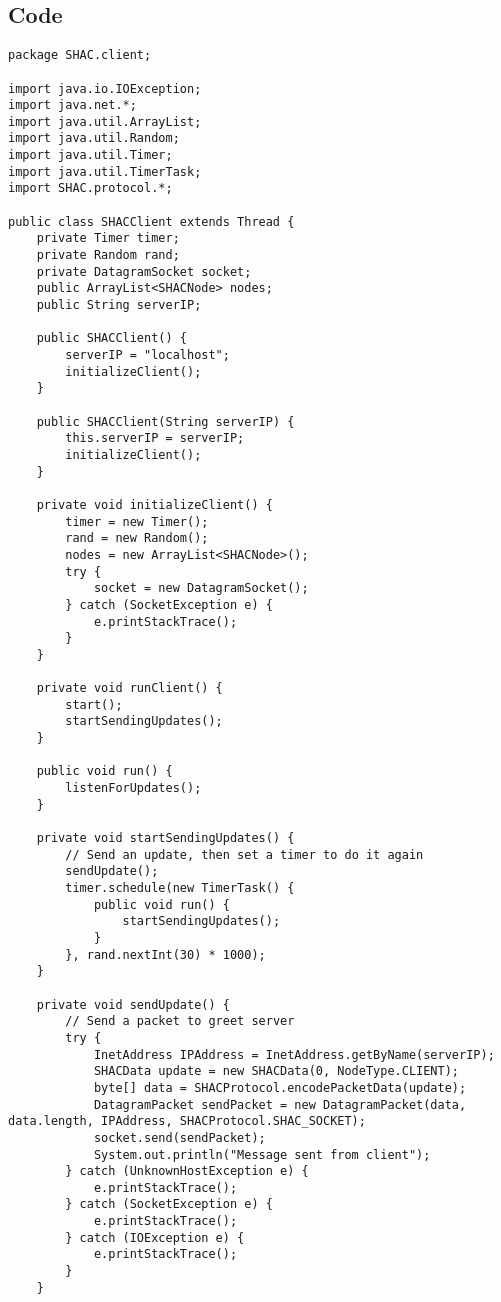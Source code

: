 \documentclass[11pt]{article}
\begin{document}
\begin{doublespace}
  \section{Code}

\begin{lstlisting}
package SHAC.client;

import java.io.IOException;
import java.net.*;
import java.util.ArrayList;
import java.util.Random;
import java.util.Timer;
import java.util.TimerTask;
import SHAC.protocol.*;

public class SHACClient extends Thread {
    private Timer timer;
    private Random rand;
    private DatagramSocket socket;
    public ArrayList<SHACNode> nodes;
    public String serverIP;

    public SHACClient() {
        serverIP = "localhost";
        initializeClient();
    }

    public SHACClient(String serverIP) {
        this.serverIP = serverIP;
        initializeClient();
    }

    private void initializeClient() {
        timer = new Timer();
        rand = new Random();
        nodes = new ArrayList<SHACNode>();
        try {
            socket = new DatagramSocket();
        } catch (SocketException e) {
            e.printStackTrace();
        }
    }

    private void runClient() {
        start();
        startSendingUpdates();
    }

    public void run() {
        listenForUpdates();
    }

    private void startSendingUpdates() {
        // Send an update, then set a timer to do it again
        sendUpdate();
        timer.schedule(new TimerTask() {
            public void run() {
                startSendingUpdates();
            }
        }, rand.nextInt(30) * 1000);
    }

    private void sendUpdate() {
        // Send a packet to greet server
        try {
            InetAddress IPAddress = InetAddress.getByName(serverIP);
            SHACData update = new SHACData(0, NodeType.CLIENT);
            byte[] data = SHACProtocol.encodePacketData(update);
            DatagramPacket sendPacket = new DatagramPacket(data, data.length, IPAddress, SHACProtocol.SHAC_SOCKET);
            socket.send(sendPacket);
            System.out.println("Message sent from client");
        } catch (UnknownHostException e) {
            e.printStackTrace();
        } catch (SocketException e) {
            e.printStackTrace();
        } catch (IOException e) {
            e.printStackTrace();
        }
    }


\end{lstlisting}
\end{doublespace}
\end{document}
